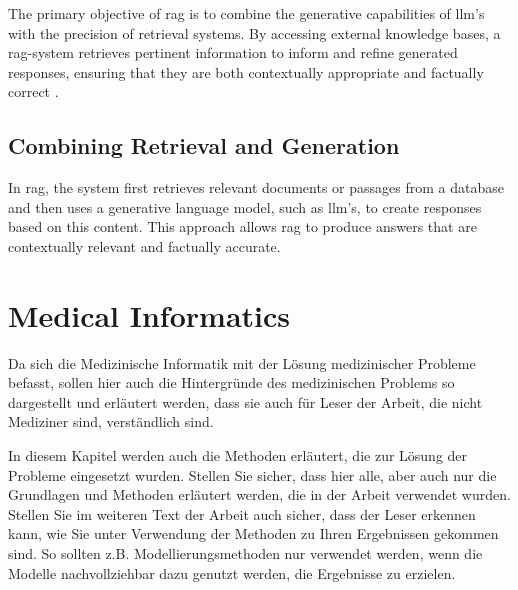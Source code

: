The primary objective of \ac{rag} is to combine the generative capabilities of \ac{llm}'s with the precision of retrieval systems. 
By accessing external knowledge bases, a \ac{rag}-system retrieves pertinent information to inform and refine generated responses, ensuring that they are both contextually appropriate and factually correct \citep{Lewis2020}.


\subsection{Combining Retrieval and Generation}\label{sec:combining-retrieval-generation}
In \ac{rag}, the system first retrieves relevant documents or passages from a database and then uses a generative language model, such as \ac{llm}'s, to create responses based on this content. This approach allows \ac{rag} to produce answers that are contextually relevant and factually accurate.


\section{Medical Informatics}\label{sec:medical-informatics}


Da sich die Medizinische Informatik mit der Lösung medizinischer Probleme befasst, sollen hier auch die Hintergründe des medizinischen Problems so dargestellt und erläutert werden, dass sie auch für Leser der Arbeit, die nicht Mediziner sind, verständlich sind.

In diesem Kapitel werden auch die Methoden erläutert, die zur Lösung der Probleme eingesetzt wurden.
Stellen Sie sicher, dass hier alle, aber auch nur die Grundlagen und Methoden erläutert werden, die in der Arbeit verwendet wurden.
Stellen Sie im weiteren Text der Arbeit auch sicher, dass der Leser erkennen kann, wie Sie unter Verwendung der Methoden zu Ihren Ergebnissen gekommen sind.
So sollten z.B. Modellierungsmethoden nur verwendet werden, wenn die Modelle nachvollziehbar dazu genutzt werden, die Ergebnisse zu erzielen.

